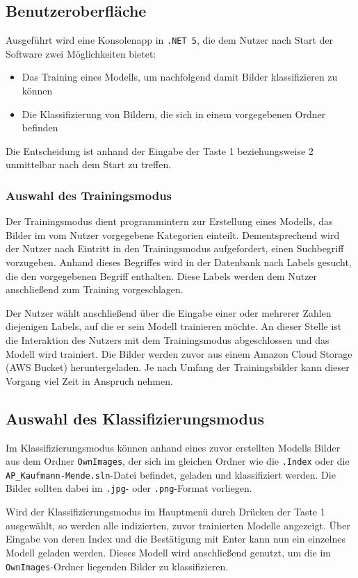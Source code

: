 \documentclass[doktyp=parbeit]{TUBAFarbeiten}
\begin{document}
\subsection{Benutzeroberfläche}
Ausgeführt wird eine Konsolenapp in \texttt{.NET 5}, die dem Nutzer nach Start der Software zwei Möglichkeiten bietet: 
\begin{itemize}
	\item Das Training eines Modells, um nachfolgend damit Bilder klassifizieren zu können
	\item Die Klassifizierung von Bildern, die sich in einem vorgegebenen Ordner befinden
\end{itemize}
Die Entscheidung ist anhand der Eingabe der Taste 1 beziehungsweise 2 unmittelbar nach dem Start zu treffen. 
\subsubsection{Auswahl des Trainingsmodus}
Der Trainingsmodus dient programmintern zur Erstellung eines Modells, das Bilder im vom Nutzer vorgegebene Kategorien einteilt. Dementsprechend wird der Nutzer nach Eintritt in den Trainingsmodus aufgefordert, einen Suchbegriff vorzugeben. Anhand dieses Begriffes wird in der Datenbank nach Labels gesucht, die den vorgegebenen Begriff enthalten. Diese Labels werden dem Nutzer anschließend zum Training vorgeschlagen. 

Der Nutzer wählt anschließend über die Eingabe einer oder mehrerer Zahlen diejenigen Labels, auf die er sein Modell trainieren möchte. An dieser Stelle ist die Interaktion des Nutzers mit dem Trainingsmodus abgeschlossen und das Modell wird trainiert. Die Bilder werden zuvor aus einem Amazon Cloud Storage (AWS Bucket) heruntergeladen. Je nach Umfang der Trainingsbilder kann dieser Vorgang viel Zeit in Anspruch nehmen.
\subsection{Auswahl des Klassifizierungsmodus}
Im Klassifizierungsmodus können anhand eines zuvor erstellten Modells Bilder aus dem Ordner \texttt{OwnImages}, der sich im gleichen Ordner wie die \texttt{.Index} oder die \texttt{AP\_Kaufmann-Mende.sln}-Datei befindet, geladen und klassifiziert werden. Die Bilder sollten dabei im \texttt{.jpg}- oder \texttt{.png}-Format vorliegen. 

Wird der Klassifizierungsmodus im Hauptmenü durch Drücken der Taste 1 ausgewählt, so werden alle indizierten, zuvor trainierten Modelle angezeigt. Über Eingabe von deren Index und die Bestätigung mit Enter kann nun ein einzelnes Modell geladen werden. Dieses Modell wird anschließend genutzt, um die im \texttt{OwnImages}-Ordner liegenden Bilder zu klassifizieren. 
\end{document}
